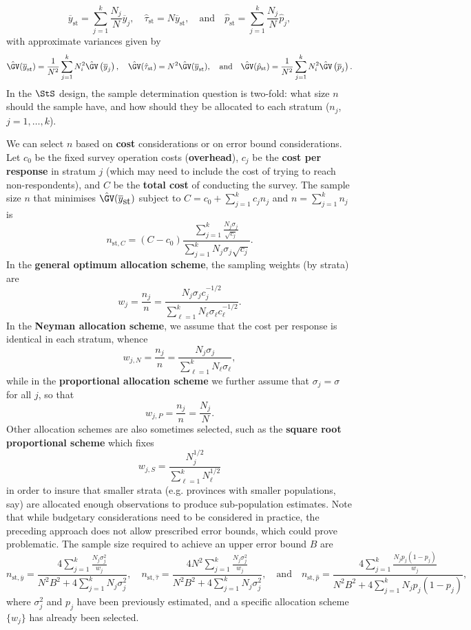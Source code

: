 $$\overline{y}_{\textrm{st}}=\sum_{j=1}^k \frac{N_j}{N}\overline{y}_j, \quad \hat{\tau}_{\textrm{st}}=N\overline{y}_{\textrm{st}}, \quad\mbox{and}\quad \hat{p}_{\textrm{st}}=\sum_{j=1}^k \frac{N_j}{N}\hat{p}_j,$$ with approximate variances given by 
$$\hat{\GV}(\overline{y}_{\textrm{st}})=\frac{1}{N^2}\sum_{j=1}^kN_i^2\hat{\GV}\left(\overline{y}_j\right),\quad \hat{\GV}(\hat{\tau}_{\textrm{st}})=N^2\hat{\GV}(\overline{y}_{\textrm{st}}),\quad\mbox{and}\quad \hat{\GV}(\hat{p}_{\textrm{st}})=\frac{1}{N^2}\sum_{j=1}^kN_i^2\hat{\GV}\left(\overline{p}_j\right).$$
In the $\StS$ design, the sample determination question is two-fold: what size $n$ should the sample have, and how should they be allocated to each stratum ($n_j$, $j=1,\ldots,k$). \par We can select $n$ based on \textbf{cost} considerations or on error bound considerations. Let $c_0$ be the fixed survey operation costs (\textbf{overhead}), $c_j$ be the \textbf{cost per response} in  stratum $j$ (which may need to include the cost of trying to reach non-respondents), and $C$ be the \textbf{total cost} of conducting the survey. The sample size $n$ that minimises  $\hat{\GV}(\overline{y}_{\mbox{st}})$ subject to   $C=c_0+\sum_{j=1}^kc_jn_j$ and $n=\sum_{j=1}^kn_j$ is $$n_{\textrm{st},C}=(C-c_0)\frac{\sum_{j=1}^k \frac{N_j\sigma_j}{\sqrt{c_j}}}{\sum_{j=1}^k N_j\sigma_j\sqrt{c_j}}.$$ In the \textbf{general optimum allocation scheme}, the sampling weights (by strata) are $$w_j=\frac{n_j}{n}=\frac{N_j\sigma_jc_{j}^{-1/2}}{\sum_{\ell=1}^kN_{\ell}\sigma_{\ell}c_{\ell}^{-1/2}}.$$ 
In the \textbf{Neyman allocation scheme}, we assume that the cost per response is identical in each stratum, whence 
$$w_{j,N}=\frac{n_j}{n}=\frac{N_j\sigma_j}{\sum_{\ell=1}^kN_{\ell}\sigma_{\ell}},$$ while in the \textbf{proportional allocation scheme} we further assume that $\sigma_j=\sigma$ for all $j$, so that $$w_{j,P}=\frac{n_j}{n}=\frac{N_j}{N}.$$ Other allocation schemes are also sometimes selected, such as the \textbf{square root proportional scheme} which fixes $$w_{j,S}=\frac{N_j^{1/2}}{\sum_{\ell=1}^kN_{\ell}^{1/2}}$$ in order to insure that smaller strata (e.g. provinces with smaller populations, say) are allocated enough observations to produce sub-population estimates. \newl Note that while budgetary considerations need to be considered in practice, the preceding approach does not allow prescribed error bounds, which could prove problematic. The sample size required to achieve an upper error bound $B$ are\small $$n_{\textrm{st},\overline{y}}=\frac{4\sum_{j=1}^k\frac{N_j\sigma_j^2}{w_j}}{N^2B^2+4\sum_{j=1}^kN_j\sigma_j^2},\quad n_{\textrm{st},\hat{\tau}}=\frac{4N^2\sum_{j=1}^k\frac{N_j\sigma_j^2}{w_j}}{N^2B^2+4\sum_{j=1}^kN_j\sigma_j^2},\quad\mbox{and}\quad n_{\textrm{st},\hat{p}}=\frac{4\sum_{j=1}^k\frac{N_jp_j(1-p_j)}{w_j}}{N^2B^2+4\sum_{j=1}^kN_jp_j(1-p_j)},$$ \normalsize where $\sigma_j^2$ and $p_j$ have been previously estimated, and a specific allocation scheme  $\{w_j\}$ has already been selected. 
